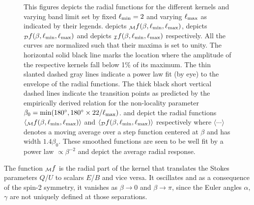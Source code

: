 \begin{figure}[t]
\hfill
{}\hfill
{}\hfill
\centering
{}

\caption{This figures depicts the radial functions for the different kernels and varying band limit set by fixed $\ell_{\rm min}=2$ and varying $\ell_{\rm max}$ as indicated by their legends.  depicts ${_{\mathcal{M}}f}(\beta,\ell_{\rm min},\ell_{\rm max})$,  depicts ${}_{\mathcal{D}}f(\beta,\ell_{\rm min},\ell_{\rm max})$ and   depicts ${}_{\mathcal{I}}f(\beta,\ell_{\rm min},\ell_{\rm max})$ respectively. All the curves are normalized such that their maxima is set to unity. The horizontal solid black line marks the location where the amplitude of the respective kernels fall below 1\% of its maximum. The thin slanted dashed gray lines indicate a power law fit (by eye) to the envelope of the radial functions. The thick black short vertical dashed lines indicate the transition points as predicted by the empirically derived relation for the non-locality parameter $\beta_0={\rm min}(180^\circ,180^\circ \times 22/\ell_{\rm max})$.  and   depict the radial functions $\langle{_{\mathcal{M}}f}(\beta,\ell_{\rm min},\ell_{\rm max})\rangle$ and $\langle{_{\mathcal{D}}f}(\beta,\ell_{\rm min},\ell_{\rm max})\rangle$ respectively where $\langle \cdots \rangle$ denotes a moving average over a step function centered at $\beta$ and has width $1.4\beta_0$. These smoothed functions are seen to be well fit by a power law $\propto \beta^{-2}$  and depict the average radial response.}
\label{fig:rad_ker_decay}
\end{figure}
%

The function ${_{\mathcal{M}}f}$ is the radial part of the kernel that translates the Stokes parameters $Q$/$U$ to scalars $E$/$B$ and vice versa.  It oscillates and as a consequence of the spin-2 symmetry, it vanishes as $\beta \rightarrow 0$ and $\beta \rightarrow \pi$, since the Euler angles $\alpha$, $\gamma$ are not uniquely defined at those separations.


